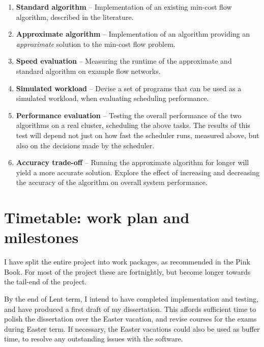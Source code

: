 \begin{enumerate}
  \item \textbf{Standard algorithm} -- Implementation of an existing min-cost flow algorithm, described in the literature.
  \item \textbf{Approximate algorithm} -- Implementation of an algorithm providing an \emph{approximate} solution to the min-cost flow problem.
  \item \textbf{Speed evaluation} -- Measuring the runtime of the approximate and standard algorithm on example flow networks.
  \item \textbf{Simulated workload} -- Devise a set of programs that can be used as a simulated workload, when evaluating scheduling performance.
  \item \textbf{Performance evaluation} -- Testing the overall performance of the two algorithms on a real cluster, scheduling the above tasks. The results of this test will depend not just on how fast the scheduler runs, measured above, but also on the decisions made by the scheduler.
  \item \textbf{Accuracy trade-off} -- Running the approximate algorithm for longer will yield a more accurate solution. Explore the effect of increasing and decreasing the accuracy of the algorithm on overall system performance.
\end{enumerate}

\section*{Timetable: work plan and milestones}

I have split the entire project into work packages, as recommended in the Pink Book. For most of the project these are fortnightly, but become longer towards the tail-end of the project.

By the end of Lent term, I intend to have completed implementation and testing, and have produced a first draft of my dissertation. This affords sufficient time to polish the dissertation over the Easter vacation, and revise courses for the exams during Easter term. If necessary, the Easter vacations could also be used as buffer time, to resolve any outstanding issues with the software. 

\newcommand{\workpackage}[3]{\item \textbf{#1} #2 #3}
\newcommand{\milestone}[1]{\textbf{Milestone:} #1}
\newcommand{\wpstartfill}[0]{\hfill \\ \\}
\newcommand{\wpendfill}[0]{\hfill \\}


